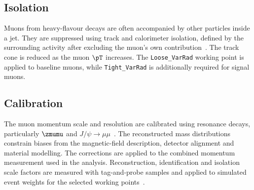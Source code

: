 \subsection{Isolation}

Muons from heavy-flavour decays are often accompanied by other particles inside a jet.
They are suppressed using track and calorimeter isolation, defined by the surrounding activity after excluding the muon's own contribution~\cite{ATLAS2021MuonID}.
The track cone is reduced as the muon $\pT$ increases.
The \texttt{Loose\_VarRad} working point is applied to baseline muons, while \texttt{Tight\_VarRad} is additionally required for signal muons.

\subsection{Calibration}

The muon momentum scale and resolution are calibrated using resonance decays, particularly $\zmumu$ and $J/\psi\rightarrow\mu\mu$~\cite{ATLAS2023MuonCalibration}.
The reconstructed mass distributions constrain biases from the magnetic-field description, detector alignment and material modelling.
The corrections are applied to the combined momentum measurement used in the analysis.
Reconstruction, identification and isolation scale factors are measured with tag-and-probe samples and applied to simulated event weights for the selected working points~\cite{ATLAS2021MuonID}.
